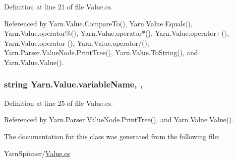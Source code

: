 Definition at line 21 of file Value.\-cs.



Referenced by Yarn.\-Value.\-Compare\-To(), Yarn.\-Value.\-Equals(), Yarn.\-Value.\-operator\%(), Yarn.\-Value.\-operator$\ast$(), Yarn.\-Value.\-operator+(), Yarn.\-Value.\-operator-\/(), Yarn.\-Value.\-operator/(), Yarn.\-Parser.\-Value\-Node.\-Print\-Tree(), Yarn.\-Value.\-To\-String(), and Yarn.\-Value.\-Value().

\hypertarget{a00189_a8ee2b09b7d28eaf97bf63c74d0023bfd}{
\subsubsection[{variable\-Name}]{\setlength{\rightskip}{0pt plus 5cm}string Yarn.\-Value.\-variable\-Name\hspace{0.3cm}{\ttfamily [get]}, {\ttfamily [set]}, {\ttfamily [package]}}}\label{a00189_a8ee2b09b7d28eaf97bf63c74d0023bfd}


Definition at line 25 of file Value.\-cs.



Referenced by Yarn.\-Parser.\-Value\-Node.\-Print\-Tree(), and Yarn.\-Value.\-Value().



The documentation for this class was generated from the following file\-:\begin{DoxyCompactItemize}
\item 
Yarn\-Spinner/\hyperlink{a00318}{Value.\-cs}\end{DoxyCompactItemize}
